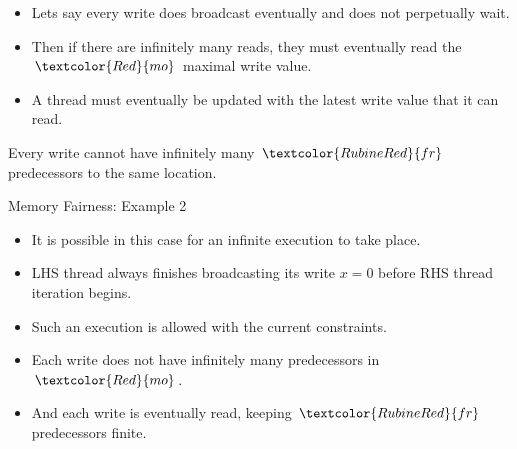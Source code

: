 \documentclass[dvipsnames, notes]{beamer}
\newcommand{\fr}{\textcolor{RubineRed}{fr}}
\newcommand{\mo}{\textcolor{Red}{mo}}
\begin{document}
    \begin{frame}
      
      \begin{figure}
      \end{figure}

      \begin{itemize}
        \item Lets say every write does broadcast eventually and does not perpetually wait.
        \item Then if there are infinitely many reads, they must eventually read the $\mo$ maximal write value.
        \item A thread must eventually be updated with the latest write value that it can read. 
      \end{itemize}

      \begin{center}
        Every write cannot have infinitely many $\fr$ predecessors to the same location. 
      \end{center}
      
    \end{frame}

    \begin{frame}{Memory Fairness: Example 2}

      \begin{figure}
      \end{figure}

      \begin{itemize}
        \item It is possible in this case for an infinite execution to take place.
        \item LHS thread always finishes broadcasting its write $x=0$ before RHS thread iteration begins.
        \item Such an execution is allowed with the current constraints.
      \end{itemize}

      \begin{itemize}
        \item Each write does not have infinitely many predecessors in $\mo$.
        \item And each write is eventually read, keeping $\fr$ predecessors finite.
      \end{itemize}
      
    \end{frame}
\end{document}
